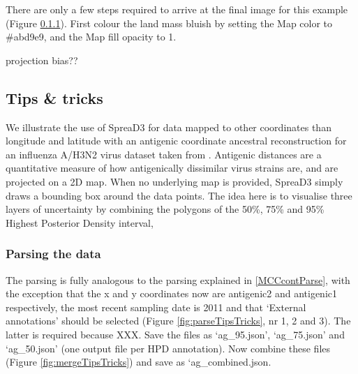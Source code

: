 \documentclass[english]{paper}
\begin{document}
There are only a few steps required to arrive at the final image for this example (Figure \ref{}).
First colour the land mass bluish by setting the Map color to \#abd9e9, and the Map fill opacity to 1.
\par
projection bias??

% 

\subsection{Tips \& tricks}

\label{tips}
% 

We illustrate the use of SpreaD3 for data mapped to other coordinates than longitude and latitude with an antigenic coordinate ancestral reconstruction for an influenza A/H3N2 virus dataset taken from \citet{Bedford:2014aa}.
Antigenic distances are a quantitative measure of how antigenically dissimilar virus strains are, and are projected on a 2D map.
When no underlying map is provided, SpreaD3 simply draws a bounding box around the data points.
The idea here is to visualise three layers of uncertainty by combining the polygons of the 50\%, 75\% and 95\% Highest Posterior Density interval,

\subsubsection{Parsing the data}

The parsing is fully analogous to the parsing explained in \ref{MCCcontParse}, with the exception that the x and y coordinates now are antigenic2 and antigenic1 respectively, the most recent sampling date is 2011 and that `External annotations' should be selected (Figure \ref{fig:parseTipsTricks}, nr 1, 2 and 3). 
The latter is required because XXX.
Save the files as `ag\_95.json', `ag\_75.json' and `ag\_50.json' (one output file per HPD annotation). 
Now combine these files (Figure \ref{fig:mergeTipsTricks}) and save as `ag\_combined.json.
\end{document}
